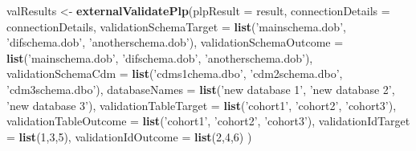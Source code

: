\documentclass[11pt]{book}
\newenvironment{Shaded}{\begin{snugshade}}{\end{snugshade}}
\newcommand{\DataTypeTok}[1]{\textcolor[rgb]{0.13,0.29,0.53}{#1}}
\newcommand{\DecValTok}[1]{\textcolor[rgb]{0.00,0.00,0.81}{#1}}
\newcommand{\KeywordTok}[1]{\textcolor[rgb]{0.13,0.29,0.53}{\textbf{#1}}}
\newcommand{\NormalTok}[1]{#1}
\newcommand{\StringTok}[1]{\textcolor[rgb]{0.31,0.60,0.02}{#1}}
\theoremstyle{definition}
\theoremstyle{definition}
\theoremstyle{definition}
\theoremstyle{remark}
\begin{document}
\begin{Shaded}
\begin{Highlighting}[]
\NormalTok{valResults <-}\StringTok{ }\KeywordTok{externalValidatePlp}\NormalTok{(}\DataTypeTok{plpResult =}\NormalTok{ result, }
                                  \DataTypeTok{connectionDetails =}\NormalTok{ connectionDetails,}
                                  \DataTypeTok{validationSchemaTarget =} \KeywordTok{list}\NormalTok{(}\StringTok{'mainschema.dob'}\NormalTok{,}
                                                                \StringTok{'difschema.dob'}\NormalTok{, }
                                                                \StringTok{'anotherschema.dob'}\NormalTok{),}
                                  \DataTypeTok{validationSchemaOutcome =} \KeywordTok{list}\NormalTok{(}\StringTok{'mainschema.dob'}\NormalTok{,}
                                                                 \StringTok{'difschema.dob'}\NormalTok{, }
                                                                 \StringTok{'anotherschema.dob'}\NormalTok{),}
                                  \DataTypeTok{validationSchemaCdm =} \KeywordTok{list}\NormalTok{(}\StringTok{'cdms1chema.dbo'}\NormalTok{,}
                                                             \StringTok{'cdm2schema.dbo'}\NormalTok{,}
                                                             \StringTok{'cdm3schema.dbo'}\NormalTok{),}
                                  \DataTypeTok{databaseNames =} \KeywordTok{list}\NormalTok{(}\StringTok{'new database 1'}\NormalTok{,}
                                                       \StringTok{'new database 2'}\NormalTok{,}
                                                       \StringTok{'new database 3'}\NormalTok{),}
                                  \DataTypeTok{validationTableTarget =} \KeywordTok{list}\NormalTok{(}\StringTok{'cohort1'}\NormalTok{,}
                                                               \StringTok{'cohort2'}\NormalTok{,}
                                                               \StringTok{'cohort3'}\NormalTok{),}
                                  \DataTypeTok{validationTableOutcome =} \KeywordTok{list}\NormalTok{(}\StringTok{'cohort1'}\NormalTok{,}
                                                                \StringTok{'cohort2'}\NormalTok{,}
                                                                \StringTok{'cohort3'}\NormalTok{),}
                                  \DataTypeTok{validationIdTarget =} \KeywordTok{list}\NormalTok{(}\DecValTok{1}\NormalTok{,}\DecValTok{3}\NormalTok{,}\DecValTok{5}\NormalTok{),}
                                  \DataTypeTok{validationIdOutcome =} \KeywordTok{list}\NormalTok{(}\DecValTok{2}\NormalTok{,}\DecValTok{4}\NormalTok{,}\DecValTok{6}\NormalTok{)}
\NormalTok{          )}
\end{Highlighting}
\end{Shaded}
\end{document}
